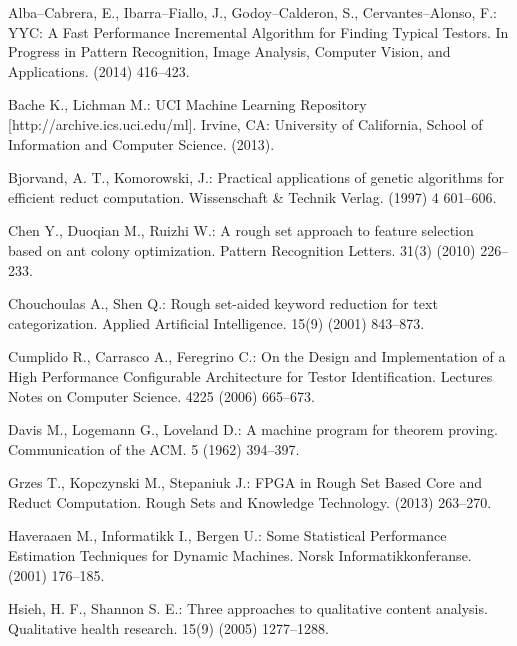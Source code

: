 \documentclass[11pt]{article}   %
\begin{document}
\newpage 
\begin{thebibliography}{}

	Alba--Cabrera, E., Ibarra--Fiallo, J., Godoy--Calderon, S., Cervantes--Alonso, F.:
 	YYC: A Fast Performance Incremental Algorithm for Finding Typical Testors. 
 	In Progress in Pattern Recognition, Image Analysis, Computer Vision, and Applications.
 	(2014) 416--423.

	Bache K., Lichman M.:  
	UCI Machine Learning Repository [http://archive.ics.uci.edu/ml]. 
	Irvine, CA: University of California, School of Information and Computer Science. (2013).

	Bjorvand, A. T., Komorowski, J.:
	Practical applications of genetic algorithms for efficient reduct computation. 
	Wissenschaft \& Technik Verlag. (1997) 4 601--606.
	
	Chen Y., Duoqian M., Ruizhi W.:
	A rough set approach to feature selection based on ant colony optimization.
	Pattern Recognition Letters. 31(3) (2010) 226--233.

	Chouchoulas A., Shen Q.:
	Rough set-aided keyword reduction for text categorization.
	Applied Artificial Intelligence. 15(9) (2001) 843--873.
	
	Cumplido R., Carrasco A., Feregrino C.:
	On the Design and Implementation of a High Performance Configurable Architecture for Testor Identification.
	Lectures Notes on Computer Science. 4225 (2006) 665--673.
	
	Davis M., Logemann G., Loveland D.:
	A machine program for theorem proving.
	Communication of the ACM. 5 (1962) 394--397.

	Grzes T., Kopczynski M., Stepaniuk J.:
	FPGA in Rough Set Based Core and Reduct Computation. 
	Rough Sets and Knowledge Technology.	(2013) 263--270.

	Haveraaen M., Informatikk I.,  Bergen U.:
	Some Statistical Performance Estimation Techniques for Dynamic Machines. 
	Norsk Informatikkonferanse. (2001) 176--185.

	Hsieh, H. F., Shannon S. E.:
	Three approaches to qualitative content analysis.
	Qualitative health research. 15(9) (2005) 1277--1288.


\end{thebibliography}
\end{document}
